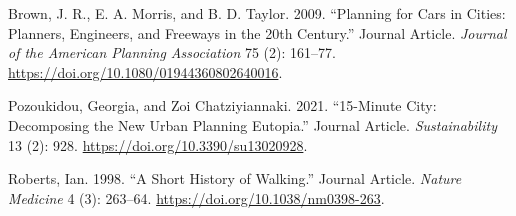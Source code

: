 \documentclass[smallextended]{svjour3}       %
\newlength{\cslhangindent}
\newlength{\cslentryspacingunit} %
\newenvironment{CSLReferences}[2] %
 {%
  \setlength{\parindent}{0pt}
  \ifodd #1
  \let\oldpar\par
  \def\par{\hangindent=\cslhangindent\oldpar}
  \fi
  \setlength{\parskip}{#2\cslentryspacingunit}
 }%
 {}
\begin{document}
\hypertarget{refs}{}
\begin{CSLReferences}{1}{0}
\leavevmode{}%
Brown, J. R., E. A. Morris, and B. D. Taylor. 2009. {``Planning for Cars
in Cities: Planners, Engineers, and Freeways in the 20th Century.''}
Journal Article. \emph{Journal of the American Planning Association} 75
(2): 161--77. \url{https://doi.org/10.1080/01944360802640016}.

\leavevmode{}%
Pozoukidou, Georgia, and Zoi Chatziyiannaki. 2021. {``15-Minute City:
Decomposing the New Urban Planning Eutopia.''} Journal Article.
\emph{Sustainability} 13 (2): 928.
\url{https://doi.org/10.3390/su13020928}.

\leavevmode{}%
Roberts, Ian. 1998. {``A Short History of Walking.''} Journal Article.
\emph{Nature Medicine} 4 (3): 263--64.
\url{https://doi.org/10.1038/nm0398-263}.

\end{CSLReferences}




\end{document}
